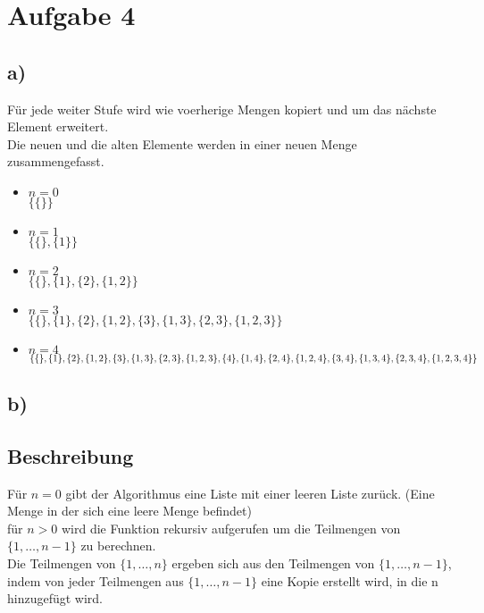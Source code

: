 \documentclass[a4paper]{scrartcl}
\begin{document}
\newpage
\section*{Aufgabe 4}
\subsection*{a)}
Für jede weiter Stufe wird wie voerherige Mengen kopiert und um das nächste Element erweitert.\\
Die neuen und die alten Elemente werden in einer neuen Menge zusammengefasst.\\
\begin{itemize}
    \item $n = 0$ \\
    $ \{ \{\} \} $
    \item $n = 1$ \\
    $ \{ \{\}, \{1\} \} $
    \item $n = 2$ \\
    $ \{ \{\}, \{1\}, \{2\}, \{1, 2\} \} $
    \item $n = 3$ \\
    $ \{ \{\}, \{1\}, \{2\}, \{1, 2\}, \{3\}, \{1, 3\}, \{2, 3\}, \{1, 2, 3\} \} $
    \item $n = 4$ \\
    $ \{ \{\}, \{1\}, \{2\}, \{1, 2\}, \{3\}, \{1, 3\}, \{2, 3\}, \{1, 2, 3\}, \\ \{4\}, \{1, 4\}, \{2, 4\}, \{1, 2, 4\}, \{3, 4\}, \{1, 3, 4\}, \{2, 3, 4\}, \{1, 2, 3, 4\} \} $
\end{itemize}

\subsection*{b)}
\subsection*{Beschreibung}
Für $n = 0$ gibt der Algorithmus eine Liste mit einer leeren Liste zurück. (Eine Menge in der sich eine leere Menge befindet)\\
für $n > 0$ wird die Funktion rekursiv aufgerufen um die Teilmengen von $\{1, \ldots, n-1\}$ zu berechnen.\\
Die Teilmengen von $\{1, \ldots, n\}$ ergeben sich aus den Teilmengen von $\{1, \ldots, n-1\}$, indem von jeder Teilmengen aus $\{1, \ldots, n-1\}$ eine Kopie erstellt wird, in die n hinzugefügt wird.\\
\newpage
\end{document}
